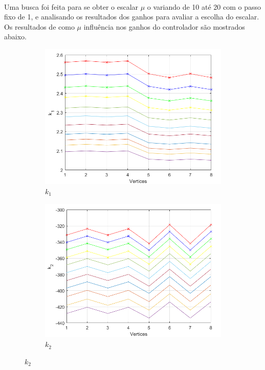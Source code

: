 \documentclass[a4paper,10pt]{article}
\begin{document}
\paragraph{}Uma busca foi feita para se obter o escalar $\mu$ o variando de 10 até 20 com o passo fixo de 1, e analisando os resultados dos ganhos para avaliar a escolha do escalar. Os resultados de como $\mu$ influência nos ganhos do controlador são mostrados abaixo.
\begin{figure}[H]
	\centering
	\begin{subfigure}[b]{0.3\textwidth}
		\centering
		\includegraphics[scale=0.7]{fig/pdchmuk1}
		\caption{$k_1$}
	\end{subfigure}
	\hfill
	\begin{subfigure}[b]{0.45\textwidth}
		\centering
		\includegraphics[scale=0.7]{fig/pdchmuk2}
		\caption{$k_2$}
	\end{subfigure}
\end{figure}
\end{document}
